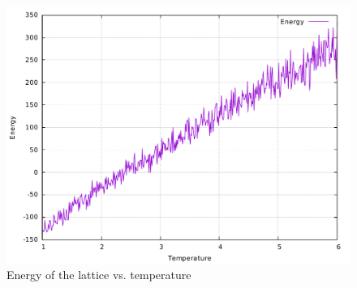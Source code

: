 \documentclass[10pt,a4paper]{article}
\begin{document}
 \begin{figure}[ht!]
  \centering
  \includegraphics[width=0.6\linewidth]{figs/energyVsTemp.pdf}
  \caption{Energy of the lattice vs. temperature}
  \label{fig:Evstemp}
 \end{figure}
\end{document}
